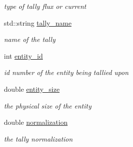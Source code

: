 \begin{DoxyCompactItemize}
\begin{DoxyCompactList}\small\item\em type of tally flux or current \end{DoxyCompactList}\item 
\hypertarget{classpyne_1_1_tally_af5e75c809e337a06d26636020d3f1809}{std\+::string \hyperlink{classpyne_1_1_tally_af5e75c809e337a06d26636020d3f1809}{tally\+\_\+name}}\label{classpyne_1_1_tally_af5e75c809e337a06d26636020d3f1809}

\begin{DoxyCompactList}\small\item\em name of the tally \end{DoxyCompactList}\item 
\hypertarget{classpyne_1_1_tally_a84aa789b361f4323e2906a411ef3a791}{int \hyperlink{classpyne_1_1_tally_a84aa789b361f4323e2906a411ef3a791}{entity\+\_\+id}}\label{classpyne_1_1_tally_a84aa789b361f4323e2906a411ef3a791}

\begin{DoxyCompactList}\small\item\em id number of the entity being tallied upon \end{DoxyCompactList}\item 
\hypertarget{classpyne_1_1_tally_a1a19c1b79ed25ea2a3d08b15b30bbea1}{double \hyperlink{classpyne_1_1_tally_a1a19c1b79ed25ea2a3d08b15b30bbea1}{entity\+\_\+size}}\label{classpyne_1_1_tally_a1a19c1b79ed25ea2a3d08b15b30bbea1}

\begin{DoxyCompactList}\small\item\em the physical size of the entity \end{DoxyCompactList}\item 
\hypertarget{classpyne_1_1_tally_a8ff1eb44926ad1e415386983679c78f1}{double \hyperlink{classpyne_1_1_tally_a8ff1eb44926ad1e415386983679c78f1}{normalization}}\label{classpyne_1_1_tally_a8ff1eb44926ad1e415386983679c78f1}

\begin{DoxyCompactList}\small\item\em the tally normalization \end{DoxyCompactList}\end{DoxyCompactItemize}


